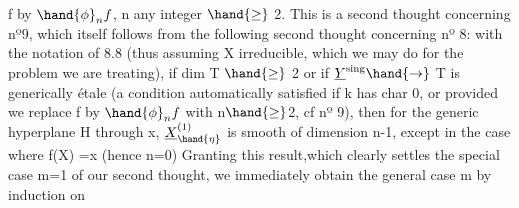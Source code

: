 f by $\hand{\phi}_{n}f$, n any integer $\hand{\geq}$ 2. This is a second thought concerning nº9,
which itself follows from the following second thought concerning nº 8: with the notation of
8.8 (thus assuming X irreducible, which we may do for the problem
we are treating), if dim T $\hand{\geq}$ 2 or if $\underline{Y}^{\text{sing}}\hand{\rightarrow}$ T is
generically étale (a condition automatically satisfied if k has char 0,
or provided we replace f by $\hand{\phi}_{n}f$ with n$\hand{\geq}$2, cf nº 9), then for
the  generic hyperplane H\hand{$_{\eta}$} through x,  $\underline{X}^{(1)}_{\hand{\eta}}$ is smooth
of dimension n-1, except in the case where f(X) =\hand{$\{$}x\hand{$\}$} (hence n=0)
Granting this result,\hand{(}which clearly settles the special case m=1 of
our second thought, we immediately obtain the general case m by induction on

